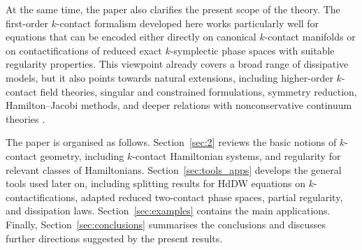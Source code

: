 \documentclass[11pt,a4paper]{article}
\theoremstyle{plain} \newtheorem{theorem}{Theorem}[section] \newtheorem{proposition}[theorem]{Proposition} \newtheorem{corollary}[theorem]{Corollary} \newtheorem{lemma}[theorem]{Lemma} \theoremstyle{definition} \newtheorem{definition}[theorem]{Definition} \theoremstyle{remark} \newtheorem{remark}[theorem]{Remark} \newtheorem{example}[theorem]{Example} %
\begin{document}
At the same time, the paper also clarifies the present scope of the theory. The first-order \(k\)-contact formalism developed here works particularly well for equations that can be encoded either directly on canonical \(k\)-contact manifolds or on contactifications of reduced exact \(k\)-symplectic phase spaces with suitable regularity properties. This viewpoint already covers a broad range of dissipative models, but it also points towards natural extensions, including higher-order \(k\)-contact field theories, singular and constrained formulations, symmetry reduction, Hamilton--Jacobi methods, and deeper relations with nonconservative continuum theories \cite{deLucasLangeSardonRivas2026}.

The paper is organised as follows. Section~\ref{sec:2} reviews the basic notions of \(k\)-contact geometry, including \(k\)-contact Hamiltonian systems, and regularity for relevant classes of Hamiltonians. Section~\ref{sec:tools_apps} develops the general tools used later on, including splitting results for HdDW equations on \(k\)-contactifications, adapted reduced two-contact phase spaces, partial regularity, and dissipation laws. Section~\ref{sec:examples} contains the main applications. Finally, Section~\ref{sec:conclusions} summarises the conclusions and discusses further directions suggested by the present results.



\end{document}
